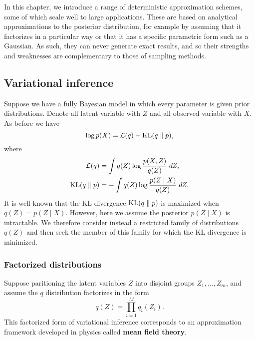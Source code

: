 \documentclass[a4paper]{article}
\begin{document}
In this chapter, we introduce a range of deterministic
approximation schemes, some of which scale well to large
applications. These are based on analytical approximations
to the posterior distribution, for example by assuming that
it factorizes in a particular way or that it has a specific
parametric form such as a Gaussian. As such, they can never
generate exact results, and so their strengths and weaknesses
are complementary to those of sampling methods.

\subsection{Variational inference}

Suppose we have a fully Bayesian model in which every parameter
is given prior distributions. Denote all latent variable with
$Z$ and all observed variable with $X$. As before we have
\[
\log p(X) = \mathcal{L}(q) + \mathrm{KL}(q \; \Vert \; p),
\]
where
\[
\begin{aligned}
  \mathcal{L}(q) &= \int q(Z) \log \frac{p(X, Z)}{q(Z)} \; d Z, \\
  \mathrm{KL}(q \; \Vert \; p) &= - \int q(Z) \log \frac{p(Z \mid X)}{q(Z)}
  \; d Z.
\end{aligned}
\]
It is well known that the KL divergence $\mathrm{KL}(q \; \Vert \; p)$ is
maximized when $q(Z) = p(Z \mid X)$. However, here we
assume the posterior $p(Z \mid X)$ is intractable.
We therefore consider instead a restricted family of
distributions $q(Z)$ and then seek the member of this
family for which the KL divergence is minimized.

\subsubsection{Factorized distributions}
Suppose paritioning the latent variables $Z$ into disjoint
groups $Z_1, \dots, Z_m$, and assume the $q$ distribution
factorizes in the form
\[
q(Z) = \prod_{i=1}^M q_i(Z_i).
\]
This factorized form of variational inference corresponds to an
approximation framework developed in physics called \textbf{mean
field theory}.
\end{document}

